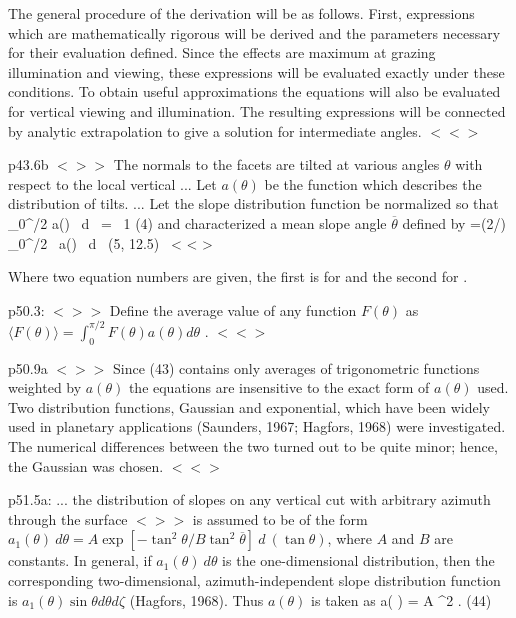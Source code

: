 \documentclass{article}
\newcommand{\qeq}{\hspace{25.mm}} %
\newcommand{\bq}{$ < \! > \!   \! >$ } %
\newcommand{\eq}{ $< \! \! < \! > $ } %
\newcommand{\eqq}{ \ < \! \! < \! > \ } %
\begin{document}
The general procedure of the derivation will be as follows. First, expressions
which are mathematically rigorous will be derived and the parameters necessary
for their evaluation defined. Since the effects are maximum at grazing
illumination and viewing, these expressions will be evaluated exactly under
these conditions. To obtain useful approximations the equations will also be
evaluated for vertical viewing and illumination. The resulting expressions will
be connected by analytic extrapolation to give a solution for intermediate
angles.  \eq

p43.6b \bq The normals to the facets are tilted at various angles $\theta$ with
respect to the local vertical ...  Let $a(\theta)$ be the function which
describes the distribution of tilts.  ...  Let the slope distribution function
be normalized so that 
\qb \int_0^{\pi/2} a(\theta) \ d \theta \ = \ 1 \qeq (4) \qe
 and characterized a mean slope angle $\overline{\theta}$  defined by 
\qb  \tan \overline{\theta} =(2/\pi) \int_0^{\pi/2} \tan \vartheta \ a(\vartheta) \ d \vartheta \ \qeq (5, 12.5) \qeq  \eqq   \qe 

Where two equation numbers are given, the first is for  and the
second for .

p50.3: \bq Define the average value of any function $ F(\theta)$ as $ \langle F(\theta) \rangle = \int _0^{\pi/2} F(\theta ) a(\theta ) d\theta $ . \eq

p50.9a \bq Since (43) contains only averages of trigonometric functions weighted
by $a(\theta)$ the equations are insensitive to the exact form of $a(\theta)$
used. Two distribution functions, Gaussian and exponential, which have been
widely used in planetary applications (Saunders, 1967; Hagfors, 1968) were
investigated. The numerical differences between the two turned out to be quite
minor; hence, the Gaussian was chosen. \eq

p51.5a:  ... the distribution of slopes on any vertical cut with arbitrary azimuth
through the surface \bq is assumed to be of the form
$ a_1(\theta ) \ d \theta  = A \exp \left[ - \tan^2 \theta /  B \tan^2 \overline{\theta} \right] \ d \ ( \tan \theta ) $, 
where $A$ and $B$ are constants. In general, if $ a_1(\theta ) \ d \theta$ is the 
one-dimensional distribution, then the corresponding two-dimensional, 
azimuth-independent slope distribution function is  
$ a_1(\theta )  \sin \theta d \theta d \zeta$  (Hagfors, 1968). 
Thus $ a(\theta )$ is taken as 
\qb a( \theta) = A \exp {} \sec^2 \theta   \sin \theta . \qeq(44) \qe
\end{document}
